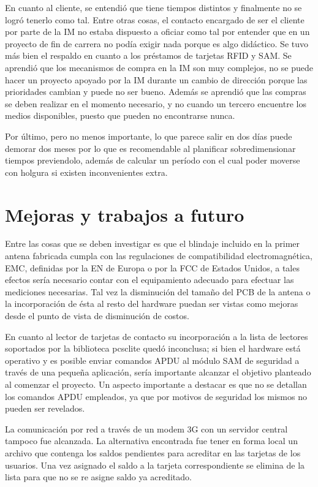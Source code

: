 \bigskip
En cuanto al cliente, se entendió que tiene tiempos distintos y finalmente no se logró tenerlo como tal. Entre otras cosas, el contacto encargado de ser el cliente por parte de la IM no estaba dispuesto a oficiar como tal por entender que en un proyecto de fin de carrera no podía exigir nada porque es algo didáctico. Se tuvo más bien el respaldo en cuanto a los préstamos de tarjetas RFID y SAM. Se aprendió que los mecanismos de compra en la IM son muy complejos, no se puede hacer un proyecto apoyado por la IM durante un cambio de dirección porque las prioridades cambian y puede no ser bueno. Además se aprendió que las compras se deben realizar en el momento necesario, y no cuando un tercero encuentre los medios disponibles, puesto que pueden no encontrarse nunca.

\bigskip
Por último, pero no menos importante, lo que parece salir en dos días puede demorar dos meses por lo que es recomendable al planificar sobredimensionar tiempos previendolo, además de calcular un período con el cual poder moverse con holgura si existen inconvenientes extra.



\section{Mejoras y trabajos a futuro}
Entre las cosas que se deben investigar es que el blindaje incluido en la 
primer antena fabricada cumpla con las regulaciones de compatibilidad 
electromagnética, EMC, definidas por la EN de Europa o por la FCC de Estados 
Unidos, a tales efectos sería necesario contar con el equipamiento adecuado
para efectuar las mediciones necesarias.
Tal vez la disminución del tamaño del PCB de la antena o la incorporación
de ésta al resto del hardware puedan ser vistas como mejoras desde el 
punto de vista de disminución de costos.

\bigskip
En cuanto al lector de tarjetas de contacto su incorporación a la lista
de lectores soportados por la biblioteca pcsclite quedó inconclusa; si 
bien el hardware está operativo y es posible enviar comandos APDU al 
módulo SAM de seguridad a través de una pequeña aplicación, sería 
importante alcanzar el objetivo planteado al comenzar el proyecto.
Un aspecto importante a destacar es que no se detallan los comandos
APDU empleados, ya que por motivos de seguridad los mismos no pueden 
ser revelados.

\bigskip
La comunicación por red a través de un modem 3G con un servidor central
tampoco fue alcanzada. La alternativa encontrada fue tener en forma local
un archivo que contenga los saldos pendientes para acreditar en las tarjetas
de los usuarios. Una vez asignado el saldo a la tarjeta correspondiente 
se elimina de la lista para que no se re asigne saldo ya acreditado.

